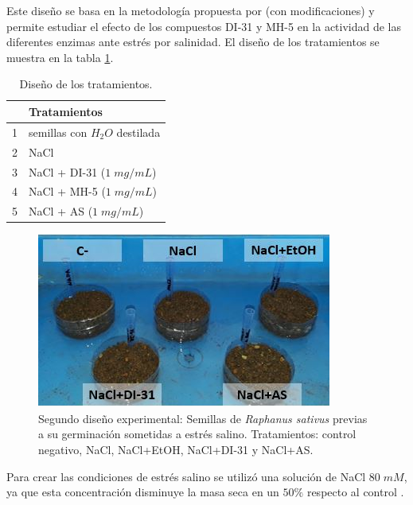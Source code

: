 Este dise\~no se basa en la metodolog\'ia propuesta por \cite{muthukumarasamy2000enhancement} (con modificaciones) y permite estudiar el efecto de los compuestos DI-31 y MH-5 en la actividad de las diferentes enzimas ante estr\'es por salinidad. El dise\~no de los tratamientos se muestra en la tabla \ref{Ttos}. \\

\begin{table}[h]
	\caption{Dise\~{n}o de los tratamientos.}
	\label{Ttos}
	\begin{center}
		\begin{tabular}{|c|l|}
			\hline 
			\textbf{ } & \textbf{Tratamientos} \\ 
			\hline 
			1 & semillas con $H_2O$ destilada \\ 
			\hline 
			2 & NaCl  \\ 
			\hline 
			3 & NaCl + DI-31 ($1 \; mg/mL$) \\ 
			\hline 
			4 & NaCl + MH-5 ($1 \; mg/mL$) \\ 
			\hline 
			5 & NaCl + AS ($1 \; mg/mL$) \\ 
			\hline 
		\end{tabular} 
	\end{center}
\end{table}

\begin{figure}[hbtp]
	\centering
	\includegraphics[scale=0.8]{Imagenes/plantas2}
	\caption{Segundo dise\~no experimental: Semillas de \textit{Raphanus sativus} previas a su germinaci\'on sometidas a estr\'es salino. Tratamientos: control negativo, NaCl, NaCl+EtOH, NaCl+DI-31 y NaCl+AS.}
	\label{plantas2}
\end{figure}

Para crear las condiciones de estr\'es salino se utiliz\'o una soluci\'on de NaCl $80\;mM$, ya que esta concentraci\'on disminuye la masa seca en un $50\%$ respecto al control \citep{muthukumarasamy2000enhancement}.\\

